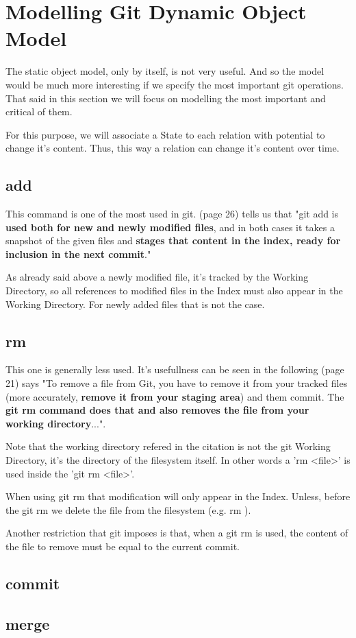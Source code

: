 \section {Modelling Git Dynamic Object Model}

The static object model, only by itself, 
is not very useful. And so
the model would be much more interesting if we specify 
the most important git operations. That said in this
section we will focus on modelling the most important
and critical of them. \par
For this purpose, we will associate a State to each relation
with potential to change it's content. Thus, this way a relation
can change it's content over time.

\subsection{add}

This command is one of the most used in git. \cite{gitComm} (page 26)
tells us that
"git add is {\bf used both for new and newly modified files},
and in both cases it takes a snapshot of the given files
and {\bf stages that content in the index, ready for inclusion
in the next commit}." \par 
As already said above a newly modified file, it's tracked by
the Working Directory, so all references to modified files in
the Index must also appear in the Working Directory. For newly
added files that is not the case.

\subsection{rm}

This one is generally less used. It's usefullness can be
seen in the following \cite{progit}
(page 21) says "To remove a file from Git, you have to remove it
from your tracked files (more accurately, {\bf remove it from your
staging area}) and them commit. The {\bf git rm command does that
and also removes the file from your working directory}...". \par
Note that the working directory refered in the citation is not
the git Working Directory, it's the directory of the filesystem itself.
In other words a 'rm <file>' is used inside the 'git rm <file>'. \par
When using git rm
that modification will only appear in the Index. Unless, before
the git rm we delete the file from the filesystem (e.g. rm ). \par
Another restriction that git imposes is that, when a git rm is used, the
content of the file to remove must be equal to the current commit. \par


\subsection{commit}

\subsection{merge}
